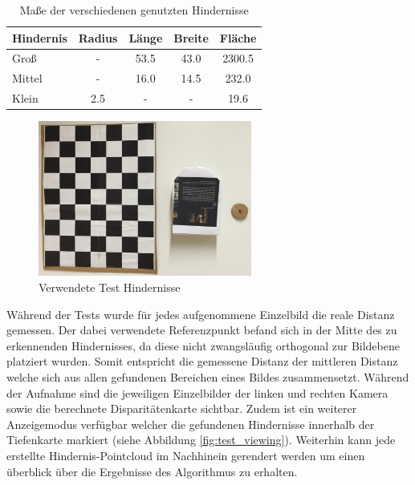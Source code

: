 \begin{table}[h]
\centering
\begin{tabular}{|l|c|c|c|c|}
\hline
Hindernis   & Radius & Länge & Breite & Fläche \\
\hline
Groß   		&   -    & 53.5  & 43.0   & 2300.5 \\
\hline
Mittel 		& 	-    & 16.0  & 14.5   & 232.0\\
\hline
Klein		&  2.5	 &   -   &   -    & 19.6 \\
\hline	
\end{tabular}
\caption{Maße der verschiedenen genutzten Hindernisse}
\label{tbl:obstacle_sizes}
\end{table}

\begin{figure}[h]
	\centering
	\includegraphics[width=7cm]{img/test_obstacles}
	\caption{Verwendete Test Hindernisse}
	\label{fig:test_obstacles}
\end{figure}


\noindent
Während der Tests wurde für jedes aufgenommene Einzelbild die reale Distanz gemessen. Der dabei verwendete Referenzpunkt befand sich in der Mitte des zu erkennenden Hindernisses, da diese nicht zwangsläufig orthogonal zur Bildebene platziert wurden. Somit entspricht die gemessene Distanz der mittleren Distanz welche sich aus allen gefundenen Bereichen eines Bildes zusammensetzt. Während der Aufnahme sind die jeweiligen Einzelbilder der linken und rechten Kamera sowie die berechnete Disparitätenkarte sichtbar. Zudem ist ein weiterer Anzeigemodus verfügbar welcher die gefundenen Hindernisse innerhalb der Tiefenkarte markiert (siehe Abbildung \ref{fig:test_viewing}). Weiterhin kann jede erstellte Hindernis-Pointcloud im Nachhinein gerendert werden um einen überblick über die Ergebnisse des Algorithmus zu erhalten.\\

